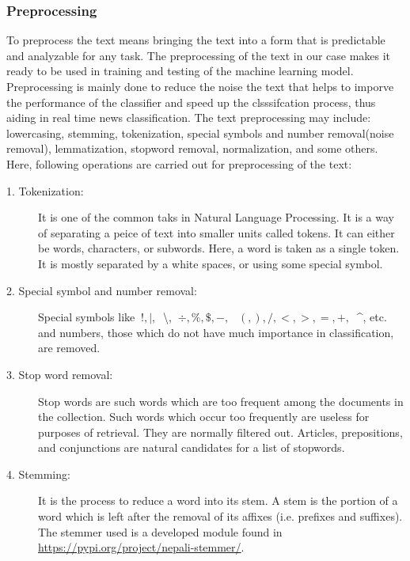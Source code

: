 \documentclass[12pt]{report}
\begin{document}
        \subsubsection{Preprocessing}
            To preprocess the text means bringing the text into a form that is predictable and analyzable for any task. The preprocessing of the text in our case
            makes it ready to be used in training and testing of the machine learning model. Preprocessing is mainly done to reduce the noise the text that
            helps to imporve the performance of the classifier and speed up the clsssifcation process, thus aiding in real time news classification. The text preprocessing may
            include: lowercasing, stemming, tokenization, special symbols and number removal(noise removal), lemmatization, stopword removal, normalization, and some others.
            Here, following operations are carried out for preprocessing of the text:
            \begin{description}
                \item[1. Tokenization:]
                     It is one of the common taks in Natural Language Processing. It is a way of separating a peice of text into smaller units called tokens.
                    It can either be words, characters, or subwords. Here, a word is taken as a single token. It is mostly separated by a white spaces, or using some special symbol.
                \item[2. Special symbol and number removal:] Special symbols like $~{!, |, }~$ \textbackslash,
                $~{ \div, \%, \$, -,}~$ \newline $~{(, ), /, <, >, =, +,}~$  \textasciicircum, etc. and numbers, those which do not have much importance in classification, are removed.

                \item [3. Stop word removal:] Stop words are such words which are too frequent among the documents in the collection. Such words
                    which occur too frequently are useless for purposes of retrieval. They are normally filtered out. Articles, prepositions, and conjunctions
                    are natural candidates for a list of stopwords.
                \item [4. Stemming:] It is the process to reduce a word into its stem. A stem is the portion of a word which is left after the removal
                    of its affixes (i.e. prefixes and suffixes). The stemmer used is a developed module found in \url{https://pypi.org/project/nepali-stemmer/}.

            \end{description}
\end{document}
